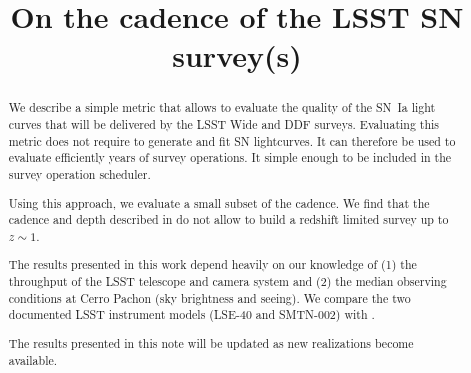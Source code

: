 \documentclass[\docopts]{\docclass}
\begin{document}
\title{ On the cadence of the LSST SN survey(s) }

\maketitlepre

\begin{abstract}

  
  We describe a simple metric that allows to evaluate the quality of
  the SN~Ia light curves that will be delivered by the LSST Wide and
  DDF surveys.  Evaluating this metric does not require to generate
  and fit SN lightcurves.  It can therefore be used to evaluate
  efficiently years of survey operations. It simple enough to be
  included in the survey operation scheduler.
  
  Using this approach, we evaluate a small subset of the 
   cadence. We find that the cadence and depth
  described in  do not allow to build a redshift
  limited survey up to $z \sim 1$.

  The results presented in this work depend heavily on our knowledge
  of (1) the throughput of the LSST telescope and camera system and
  (2) the median observing conditions at Cerro Pachon (sky brightness
  and seeing).  We compare the two documented LSST instrument models
  (LSE-40 and SMTN-002) with .



  The results presented in this note will be updated as new
   realizations become available.
\end{abstract}


\maketitlepost

% 
\end{document}
